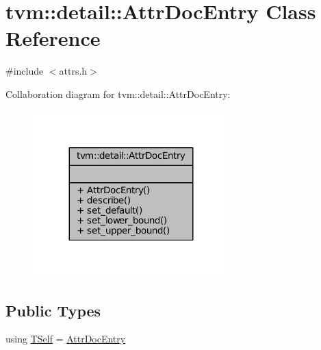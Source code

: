 \hypertarget{classtvm_1_1detail_1_1AttrDocEntry}{}\section{tvm\+:\+:detail\+:\+:Attr\+Doc\+Entry Class Reference}
\label{classtvm_1_1detail_1_1AttrDocEntry}


{\ttfamily \#include $<$attrs.\+h$>$}



Collaboration diagram for tvm\+:\+:detail\+:\+:Attr\+Doc\+Entry\+:
\nopagebreak
\begin{figure}[H]
\begin{center}
\leavevmode
\includegraphics[width=215pt]{classtvm_1_1detail_1_1AttrDocEntry__coll__graph}
\end{center}
\end{figure}
\subsection*{Public Types}
\begin{DoxyCompactItemize}
\item 
using \hyperlink{classtvm_1_1detail_1_1AttrDocEntry_a8bab3adf8242c94bd163ab7484170a5d}{T\+Self} = \hyperlink{classtvm_1_1detail_1_1AttrDocEntry}{Attr\+Doc\+Entry}
\end{DoxyCompactItemize}
